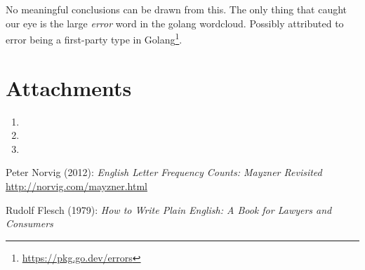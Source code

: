 \documentclass[]{article}
\begin{document}
No meaningful conclusions can be drawn from this. The only thing that caught our eye is the large \emph{error} word in the golang wordcloud. Possibly attributed to error being a first-party type in Golang\footnote{\url{https://pkg.go.dev/errors}}.


\section{Attachments} \label{attachments}

\begin{enumerate}
    \item %
    \item %
    \item %
\end{enumerate}


\begin{thebibliography}{9}
    Peter Norvig (2012): \emph{English Letter Frequency Counts: Mayzner Revisited} \url{http://norvig.com/mayzner.html}

    Rudolf Flesch (1979): \emph{How to Write Plain English: A Book for Lawyers and Consumers}
\end{thebibliography}
\end{document}
